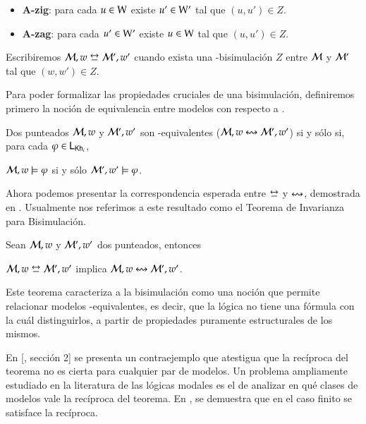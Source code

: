 \begin{definicion}
\begin{itemize}
        \item \textbf{A-zig}: para cada $u \in \mathrm{W}$ existe $u' \in \mathrm{W}'$ tal que $(u,u') \in Z$.

        \item \textbf{A-zag}: para cada $u' \in \mathrm{W}'$ existe $u \in \mathrm{W}$ tal que $(u,u') \in Z$.
    \end{itemize} 

    Escribiremos $\modults,w \bisim \modults',w'$ cuando exista una \KHilogic-bisimulación $Z$ entre
    $\mathcal{M}$ y $\mathcal{M}'$ tal que $(w,w') \in Z$.

\end{definicion}

Para poder formalizar las propiedades cruciales de una bisimulación, definiremos primero la noción de 
equivalencia entre modelos con respecto a \KHilogic.

\begin{definicion}
    Dos \ultss punteados $\mathcal{M},w$ y $\mathcal{M}',w'$ son \KHilogic-equivalentes ($\mathcal{M}, w \mathrel{\leftrightsquigarrow} \mathcal{M}', w'$)
    si y sólo si, para cada $\varphi \in \mathsf{L}_{\mathsf{Kh}_i}$,
    \begin{center}
        $\mathcal{M}, w \models \varphi$ \quad si y sólo \quad $\mathcal{M}', w' \models \varphi$.
    \end{center} 
\end{definicion}

Ahora podemos presentar la correspondencia esperada entre $\bisim$ y $\mathrel{\leftrightsquigarrow}$, demostrada en \cite{ArecesFSV25}.
Usualmente nos referimos a este resultado como el Teorema de Invarianza para Bisimulación.

\begin{teorema}\label{thm:bisim-implies-equivalence}
    Sean $\mathcal{M},w$ y $\mathcal{M}',w'$ dos \ultss punteados, entonces
    \begin{center}
        $\modults,w \bisim \modults',w'$ implica $\mathcal{M},w \mathrel{\leftrightsquigarrow} \mathcal{M}',w'$.
    \end{center}
\end{teorema}

Este teorema caracteriza a la bisimulación como una noción que permite relacionar modelos \KHilogic-equivalentes, es decir, que la lógica no tiene una fórmula con la cuál distinguirlos,
a partir de propiedades puramente estructurales de los mismos.

En [\cite{FervariVQW21}, sección 2] se presenta un contraejemplo que atestigua que la recíproca del teorema no es cierta para cualquier par de modelos.
Un problema ampliamente estudiado en la literatura de las lógicas modales es el de analizar en qué clases de modelos vale la recíproca del teorema.
En \cite{ArecesFSV25}, se demuestra que en el caso finito se satisface la recíproca.

